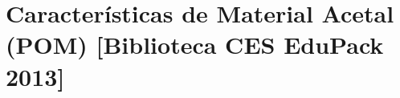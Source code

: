 \chapter{Caracter\'isticas de Material Acetal (POM) [Biblioteca CES EduPack 2013] }

\newpage



\newpage


